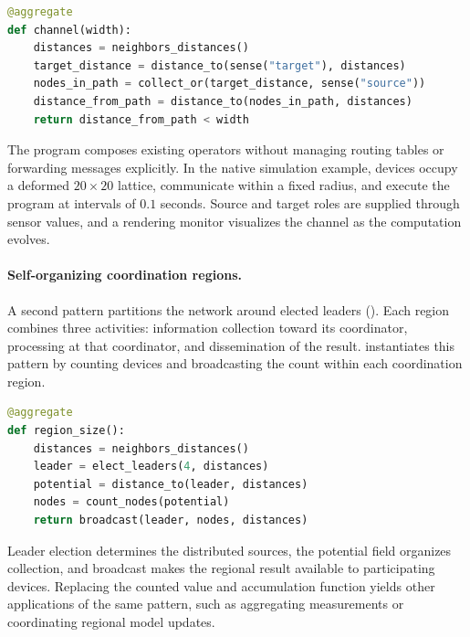 \begin{lstlisting}[language=Python,breaklines=true,
  caption={Construction of a channel between a source and a target.},
  label={lst:phyelds-channel}]
@aggregate
def channel(width):
    distances = neighbors_distances()
    target_distance = distance_to(sense("target"), distances)
    nodes_in_path = collect_or(target_distance, sense("source"))
    distance_from_path = distance_to(nodes_in_path, distances)
    return distance_from_path < width
\end{lstlisting}

The program composes existing operators without managing routing tables or
 forwarding messages explicitly.
%
In the native simulation example, devices occupy a deformed
 $20 \times 20$ lattice, communicate within a fixed radius, and execute
 the program at intervals of $0.1$ seconds.
%
Source and target roles are supplied through sensor values, and a rendering
 monitor visualizes the channel as the computation evolves.

\paragraph{Self-organizing coordination regions.}
A second pattern partitions the network around elected leaders ().
%
Each region combines three activities: information collection toward its
 coordinator, processing at that coordinator, and dissemination of the result.
%
 instantiates this pattern by counting devices and
 broadcasting the count within each coordination region.

\begin{lstlisting}[language=Python,breaklines=true,
  caption={Counting devices within self-organizing coordination regions.},
  label={lst:phyelds-regions}]
@aggregate
def region_size():
    distances = neighbors_distances()
    leader = elect_leaders(4, distances)
    potential = distance_to(leader, distances)
    nodes = count_nodes(potential)
    return broadcast(leader, nodes, distances)
\end{lstlisting}

Leader election determines the distributed sources, the potential field
 organizes collection, and broadcast makes the regional result available
 to participating devices.
%
Replacing the counted value and accumulation function yields other
 applications of the same pattern, such as aggregating measurements or
 coordinating regional model updates.

